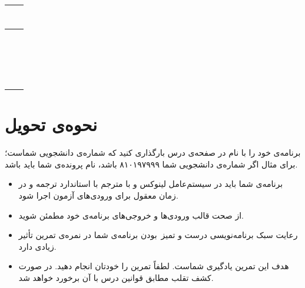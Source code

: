 \documentclass{utsignal}
\begin{document}
\begin{table}[H]
\begin{tabular}{|c|c|}
\begin{latin}
\begin{minipage}[]{0.3\textwidth}
\begin{verbatim}
            \end{verbatim}
            \end{minipage}\end{latin}
            \\
            \hline
            \begin{latin}\begin{minipage}[]{0.3\textwidth}\footnotesize
            \end{minipage}\end{latin}
            &
            \begin{latin}\begin{minipage}[]{0.3\textwidth}\footnotesize
            \begin{verbatim}





            \end{verbatim}
            \end{minipage}\end{latin}
            \\
            \hline
        \end{tabular}
    \end{table}
    
    \section{نحوه‌ی تحویل}

    برنامه‌ی خود را با نام  در صفحه‌ی  درس بارگذاری کنید که  شماره‌ی دانشجویی شماست؛ برای مثال اگر شماره‌ی دانشجویی شما ۸۱۰۱۹۷۹۹۹ باشد، نام پرونده‌ی شما باید  باشد.

    \begin{itemize}
        \item برنامه‌ی شما باید در سیستم‌عامل لینوکس و با مترجم  با استاندارد  ترجمه و در زمان معقول برای ورودی‌های آزمون اجرا شود.
        \item از صحت قالب ورودی‌ها و خروجی‌های برنامه‌ی خود مطمئن شوید.
        \item رعایت سبک برنامه‌نویسی درست و تمیز~بودن برنامه‌ی شما در نمره‌ی تمرین تأثیر زیادی دارد.
        \item هدف این تمرین یادگیری شماست. لطفاً تمرین را خودتان انجام دهید. در صورت کشف تقلب مطابق قوانین درس با آن برخورد خواهد شد.
    \end{itemize}
\end{document}
